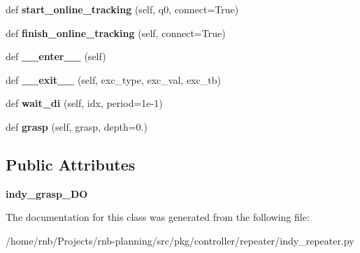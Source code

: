 \begin{DoxyCompactItemize}
\item 
\mbox{\label{classrnb-planning_1_1src_1_1pkg_1_1controller_1_1repeater_1_1indy__repeater_1_1indytraj__client_afc16fbb70500620425accc1c54348e73}} 
def {\bfseries start\+\_\+online\+\_\+tracking} (self, q0, connect=True)
\item 
\mbox{\label{classrnb-planning_1_1src_1_1pkg_1_1controller_1_1repeater_1_1indy__repeater_1_1indytraj__client_a6c986a861c29f63bb87d15b76b52941e}} 
def {\bfseries finish\+\_\+online\+\_\+tracking} (self, connect=True)
\item 
\mbox{\label{classrnb-planning_1_1src_1_1pkg_1_1controller_1_1repeater_1_1indy__repeater_1_1indytraj__client_a85d34a1bcbd7edcb962790219e18080f}} 
def {\bfseries \+\_\+\+\_\+enter\+\_\+\+\_\+} (self)
\item 
\mbox{\label{classrnb-planning_1_1src_1_1pkg_1_1controller_1_1repeater_1_1indy__repeater_1_1indytraj__client_acd6004ccb10cf961bc032cd03c9c451f}} 
def {\bfseries \+\_\+\+\_\+exit\+\_\+\+\_\+} (self, exc\+\_\+type, exc\+\_\+val, exc\+\_\+tb)
\item 
\mbox{\label{classrnb-planning_1_1src_1_1pkg_1_1controller_1_1repeater_1_1indy__repeater_1_1indytraj__client_a35dd3f0caf07ca91d92d6720fbffe9b4}} 
def {\bfseries wait\+\_\+di} (self, idx, period=1e-\/1)
\item 
\mbox{\label{classrnb-planning_1_1src_1_1pkg_1_1controller_1_1repeater_1_1indy__repeater_1_1indytraj__client_affe23da30cf023edd26963b95418ff41}} 
def {\bfseries grasp} (self, grasp, depth=0.)
\end{DoxyCompactItemize}
\subsection*{Public Attributes}
\begin{DoxyCompactItemize}
\item 
\mbox{\label{classrnb-planning_1_1src_1_1pkg_1_1controller_1_1repeater_1_1indy__repeater_1_1indytraj__client_a8e023943de4af6334c3412896661eeba}} 
{\bfseries indy\+\_\+grasp\+\_\+\+DO}
\end{DoxyCompactItemize}


The documentation for this class was generated from the following file\+:\begin{DoxyCompactItemize}
\item 
/home/rnb/\+Projects/rnb-\/planning/src/pkg/controller/repeater/indy\+\_\+repeater.\+py\end{DoxyCompactItemize}
